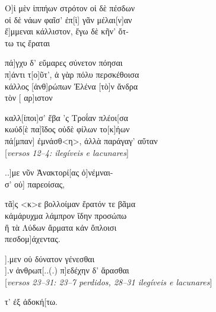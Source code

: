 \begin{gkverse}
Ο]ἰ μὲν ἰππήων στρότον οἰ δὲ πέσδων\\
οἰ δὲ νάων φαῖσ’ ἐπ[ὶ] γᾶν μέλαι[ν]αν\\
ἔ]μμεναι κάλλιστον, ἔγω δὲ κῆν’ ὄτ-\\
τω τις ἔραται

πά]γχυ δ’ εὔμαρες σύνετον πόησαι\\
π]άντι τ[ο]ῦτ’, ἀ γὰρ πόλυ περσκέθοισα\\
κάλλος [ἀνθ]ρώπων Ἐλένα [τὸ]ν ἄνδρα\\
τὸν [    αρ]ιστον

καλλ[ίποι]σ’ ἔβα ’ς Τροΐαν πλέοι[σα\\
κωὐδ[ὲ πα]ῖδος οὐδὲ φίλων το[κ]ήων\\
πά[μπαν] ἐμνάσθ<η>, ἀλλὰ παράγαγ’ αὔταν\\

\textnormal{[\textit{versos 12--4: ilegíveis e lacunares}]}

..]με νῦν Ἀνακτορί[ας ὀ]νέμναι-\\
σ’ οὐ] παρεοίσας,

τᾶ]ς <κ>ε βολλοίμαν ἔρατόν τε βᾶμα\\
κἀμάρυχμα λάμπρον ἴδην προσώπω\\
ἢ τὰ Λύδων ἄρματα κἀν ὄπλοισι\\
πεσδομ]άχεντας.

			   ].μεν οὑ δύνατον γένεσθαι\\
		   ].ν ἀνθρωπ[..(.) π]εδέχην δ’ ἅρασθαι\\

\textnormal{[\textit{versos 23--31: 23--7 perdidos, 28--31 ilegíveis e lacunares}]}


     τ’ ἐξ ἀδοκή[τω.
\end{gkverse}

\chapter*{}
\section*{}
\section*{}

